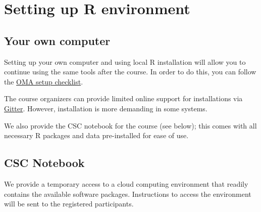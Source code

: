 \documentclass[
  oneside]{book}
\begin{document}
\hypertarget{renv}{%
\section{Setting up R environment}\label{renv}}

\hypertarget{your-own-computer}{%
\subsection{Your own computer}\label{your-own-computer}}

Setting up your own computer and using local R installation will allow
you to continue using the same tools after the course. In order to do
this, you can follow the \href{https://microbiome.github.io/OMA/training.html\#training}{OMA setup checklist}.

The course organizers can provide limited online support for installations via \href{https://microbiome.github.io/OMA/training.html\#support-and-resources}{Gitter}. However, installation is more demanding in some systems.

We also provide the CSC notebook for the course (see below); this
comes with all necessary R packages and data pre-installed for ease of
use.

\hypertarget{csc-notebook}{%
\subsection{CSC Notebook}\label{csc-notebook}}

We provide a temporary access to a cloud computing environment
that readily contains the available software packages. Instructions to access
the environment will be sent to the registered participants.
\end{document}
